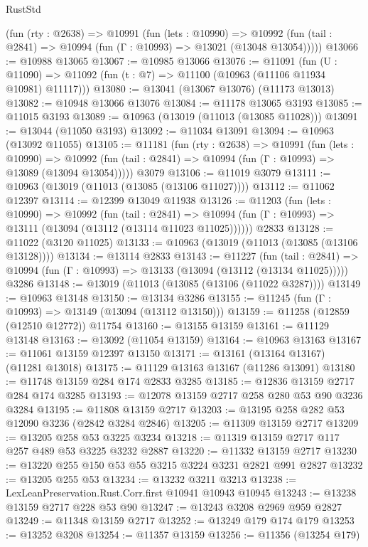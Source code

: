 \begin{lexlean}{RustStd}
\begin{coremodule}
{\begin{coremodule}
{{{{{{{{{{{{{{{{{{{{{{{{{{{{{{{{{    (fun (rty : @2638) =>
    @10991
      (fun (lets : @10990) =>
      @10992 (fun (tail : @2841) => @10994 (fun (Γ : @10993) => @13021 (@13048 @13054)))))
@13066 := @10988 @13065
@13067 := @10985 @13066
@13076 := @11091
    (fun (U : @11090) => @11092 (fun (t : @7) => @11100 (@10963 (@11106 @11934 @10981) @11117)))
@13080 := @13041 (@13067 @13076) (@11173 @13013)
@13082 := @10948 @13066 @13076
@13084 := @11178 @13065 @3193
@13085 := @11015 @3193
@13089 := @10963 (@13019 (@11013 (@13085 @11028)))
@13091 := @13044 (@11050 @3193)
@13092 := @11034 @13091
@13094 := @10963 (@13092 @11055)
@13105 := @11181
    (fun (rty : @2638) =>
    @10991
      (fun (lets : @10990) =>
      @10992 (fun (tail : @2841) => @10994 (fun (Γ : @10993) => @13089 (@13094 @13054)))))
    @3079
@13106 := @11019 @3079
@13111 := @10963 (@13019 (@11013 (@13085 (@13106 @11027))))
@13112 := @11062 @12397
@13114 := @12399 @13049 @11938
@13126 := @11203
    (fun (lets : @10990) =>
    @10992
      (fun (tail : @2841) =>
      @10994 (fun (Γ : @10993) => @13111 (@13094 (@13112 (@13114 @11023 @11025))))))
    @2833
@13128 := @11022 (@3120 @11025)
@13133 := @10963 (@13019 (@11013 (@13085 (@13106 @13128))))
@13134 := @13114 @2833
@13143 := @11227
    (fun (tail : @2841) => @10994 (fun (Γ : @10993) => @13133 (@13094 (@13112 (@13134 @11025)))))
    @3286
@13148 := @13019 (@11013 (@13085 (@13106 (@11022 @3287))))
@13149 := @10963 @13148
@13150 := @13134 @3286
@13155 := @11245 (fun (Γ : @10993) => @13149 (@13094 (@13112 @13150)))
@13159 := @11258 (@12859 (@12510 @12772)) @11754
@13160 := @13155 @13159
@13161 := @11129 @13148
@13163 := @13092 (@11054 @13159)
@13164 := @10963 @13163
@13167 := @11061 @13159 @12397 @13150
@13171 := @13161 (@13164 @13167) (@11281 @13018)
@13175 := @11129 @13163 @13167 (@11286 @13091)
@13180 := @11748 @13159 @284 @174 @2833 @3285
@13185 := @12836 @13159 @2717 @284 @174 @3285
@13193 := @12078 @13159 @2717 @258 @280 @53 @90 @3236 @3284
@13195 := @11808 @13159 @2717
@13203 := @13195 @258 @282 @53 @12090 @3236 (@2842 @3284 @2846)
@13205 := @11309 @13159 @2717
@13209 := @13205 @258 @53 @3225 @3234
@13218 := @11319 @13159 @2717 @117 @257 @489 @53 @3225 @3232 @2887
@13220 := @11332 @13159 @2717
@13230 := @13220 @255 @150 @53 @55 @3215 @3224 @3231 @2821 @991 @2827
@13232 := @13205 @255 @53
@13234 := @13232 @3211 @3213
@13238 := LexLeanPreservation.Rust.Corr.first @10941 @10943 @10945
@13243 := @13238 @13159 @2717 @228 @53 @90
@13247 := @13243 @3208 @2969 @959 @2827
@13249 := @11348 @13159 @2717
@13252 := @13249 @179 @174 @179
@13253 := @13252 @3208
@13254 := @11357 @13159
@13256 := @11356 (@13254 @179)
}}}}}}}}}}}}}}}}}}}}}}}}}}}}}}}}}
\end{coremodule}}
\end{coremodule}
\end{lexlean}
